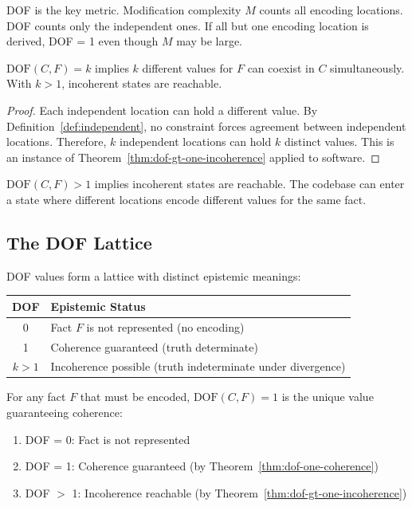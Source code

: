 DOF is the key metric. Modification complexity $M$ counts all encoding locations. DOF counts only the independent ones. If all but one encoding location is derived, DOF = 1 even though $M$ may be large.

\begin{theorem}[DOF = Incoherence Potential]\label{thm:dof-inconsistency}
$\text{DOF}(C, F) = k$ implies $k$ different values for $F$ can coexist in $C$ simultaneously. With $k > 1$, incoherent states are reachable.
\end{theorem}

\begin{proof}
Each independent location can hold a different value. By Definition~\ref{def:independent}, no constraint forces agreement between independent locations. Therefore, $k$ independent locations can hold $k$ distinct values. This is an instance of Theorem~\ref{thm:dof-gt-one-incoherence} applied to software.
\end{proof}

\begin{corollary}\label{cor:dof-risk}
$\text{DOF}(C, F) > 1$ implies incoherent states are reachable. The codebase can enter a state where different locations encode different values for the same fact.
\end{corollary}

\subsection{The DOF Lattice}\label{sec:dof-lattice}

DOF values form a lattice with distinct epistemic meanings:

\begin{center}
\begin{tabular}{cl}
\toprule
\textbf{DOF} & \textbf{Epistemic Status} \\
\midrule
0 & Fact $F$ is not represented (no encoding) \\
1 & Coherence guaranteed (truth determinate) \\
$k > 1$ & Incoherence possible (truth indeterminate under divergence) \\
\bottomrule
\end{tabular}
\end{center}

\begin{theorem}[DOF = 1 is Uniquely Coherent]\label{thm:dof-optimal}
For any fact $F$ that must be encoded, $\text{DOF}(C, F) = 1$ is the unique value guaranteeing coherence:
\begin{enumerate}
\tightlist
\item DOF = 0: Fact is not represented
\item DOF = 1: Coherence guaranteed (by Theorem~\ref{thm:dof-one-coherence})
\item DOF $>$ 1: Incoherence reachable (by Theorem~\ref{thm:dof-gt-one-incoherence})
\end{enumerate}
\end{theorem}

